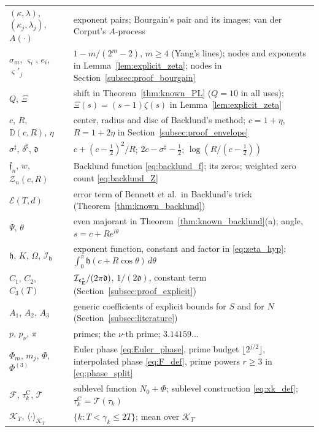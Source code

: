 \documentclass[11pt,a4paper]{article}
\makeatletter
\numberwithin{equation}{section}
\DeclareRobustCommand{\CGref}[1]{\ref{#1}}
\DeclareRobustCommand{\CGeqref}[1]{\eqref{#1}}
\let\CG@origref\ref
\let\CG@origeqref\eqref
\newcommand{\CG@gettip}[1]{\@ifundefined{CGTip@#1}{#1}{\csname CGTip@#1\endcsname}}
\DeclareRobustCommand{\CGref}[1]{\pdftooltip{\CG@origref{#1}}{\CG@gettip{#1}}}
\DeclareRobustCommand{\CGeqref}[1]{\pdftooltip{\CG@origeqref{#1}}{\CG@gettip{#1}}}
\theoremstyle{definition}
\theoremstyle{remark}
\newcommand{\Nz}{N_0} %
\newcommand{\Fc}{\mathcal F}
\newcommand{\Tc}{\mathcal T}
\newcommand{\Ph}{\Phi}
\newcommand{\eE}{\mathfrak e_{\rm E}}
\newcommand{\Kc}{\mathcal K}
\makeatother
\begin{document}
\begin{center}
\begin{longtable}{p{}p{}}
$(\kappa,\lambda)$, $(\kappa_j,\lambda_j)$, $A(\cdot)$ & exponent pairs; Bourgain's pair and its images; van der Corput's $A$-process\\
$\sigma_m$, $\varsigma_i$, $e_i$, $\varsigma'_j$ & $1-m/(2^m-2)$, $m\ge4$ (Yang's lines); nodes and exponents in Lemma~\CGref{lem:explicit_zeta}; nodes in Section~\CGref{subsec:proof_bourgain}\\
$Q$, $\Xi$ & shift in Theorem~\CGref{thm:known_PL} ($Q=10$ in all uses); $\Xi(s)=(s-1)\zeta(s)$ in Lemma~\CGref{lem:explicit_zeta}\\
$c$, $R$, $\mathbb D(c,R)$, $\eta$ & center, radius and disc of Backlund's method; $c=1+\eta$, $R=1+2\eta$ in Section~\CGref{subsec:proof_envelope}\\
$\sigma^\sharp$, $\delta^\sharp$, $\mathfrak d$ & $c+(c-\frac12)^2/R$; $2c-\sigma^\sharp-\frac12$; $\log(R/(c-\frac12))$\\
$\mathfrak f_n$, $w$, $\mathcal Z_n(c,R)$ & Backlund function \CGeqref{eq:backlund_f}; its zeros; weighted zero count \CGeqref{eq:backlund_Z}\\
$\mathcal E(T,d)$ & error term of Bennett et al.\ in Backlund's trick (Theorem~\CGref{thm:known_backlund})\\
$\Psi$, $\theta$ & even majorant in Theorem~\CGref{thm:known_backlund}(a); angle, $s=c+Re^{i\theta}$\\
$\mathfrak h$, $K$, $\Omega$, $\mathcal I_{\mathfrak h}$ & exponent function, constant and factor in \CGeqref{eq:zeta_hyp}; $\int_0^\pi\mathfrak h(c+R\cos\theta)\,d\theta$\\
$C_1$, $C_2$, $C_3(T)$ & $\mathcal I_{\eE^*}/(2\pi\mathfrak d)$, $1/(2\mathfrak d)$, constant term (Section~\CGref{subsec:proof_explicit})\\
$A_1$, $A_2$, $A_3$ & generic coefficients of explicit bounds for $S$ and for $N$ (Section~\CGref{subsec:literature})\\
$p$, $p_\nu$, $\pi$ & primes; the $\nu$-th prime; $3.14159\ldots$\\
$\Ph_m$, $m_j$, $\Ph$, $\Ph^{(3)}$ & Euler phase \CGeqref{eq:Euler_phase}, prime budget $\lfloor2^{j/2}\rfloor$, interpolated phase \CGeqref{eq:F_def}, prime powers $r\ge3$ in \CGeqref{eq:phase_split}\\
$\Fc$, $\tau_{k}^{\mathrm C}$, $\Tc$ & sublevel function $\Nz+\Ph$; sublevel construction \CGeqref{eq:xk_def}; $\tau_{k}^{\mathrm C}=\Tc(\tau_k)$\\
$\Kc_T$, $\langle\cdot\rangle_{\Kc_T}$ & $\{k:T<\gamma_k\le2T\}$; mean over $\Kc_T$\\

\end{longtable}
\end{center}
\end{document}
